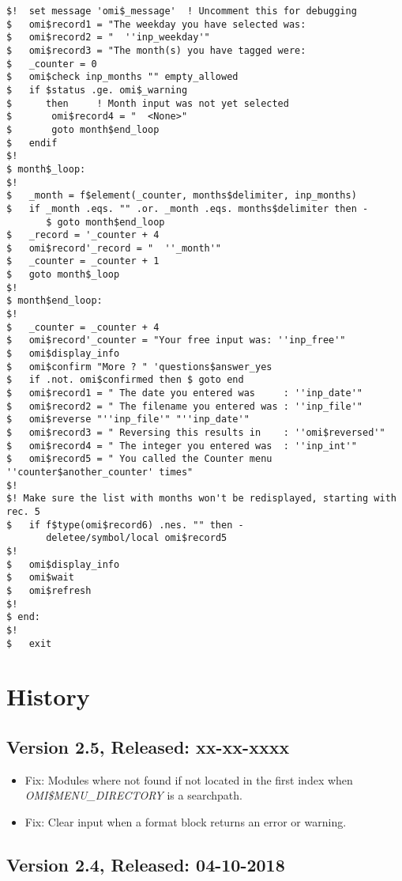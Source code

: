 \documentclass[a4paper]{book}
\begin{document}
\begin{verbatim}
$!	set message 'omi$_message'	! Uncomment this for debugging
$	omi$record1 = "The weekday you have selected was:
$	omi$record2 = "  ''inp_weekday'"
$	omi$record3 = "The month(s) you have tagged were:
$	_counter = 0
$	omi$check inp_months "" empty_allowed
$	if $status .ge. omi$_warning
$	   then 	! Month input was not yet selected
$		omi$record4 = "  <None>"
$		goto month$end_loop
$	endif
$!
$ month$_loop:
$!
$	_month = f$element(_counter, months$delimiter, inp_months)
$	if _month .eqs. "" .or. _month .eqs. months$delimiter then -
	   $ goto month$end_loop
$	_record = '_counter + 4
$	omi$record'_record = "  ''_month'"
$	_counter = _counter + 1
$	goto month$_loop
$!
$ month$end_loop:
$!
$	_counter = _counter + 4
$	omi$record'_counter = "Your free input was: ''inp_free'"
$	omi$display_info
$	omi$confirm "More ? " 'questions$answer_yes
$	if .not. omi$confirmed then $ goto end
$	omi$record1 = " The date you entered was     : ''inp_date'"
$	omi$record2 = " The filename you entered was : ''inp_file'"
$	omi$reverse "''inp_file'" "''inp_date'"
$	omi$record3 = " Reversing this results in    : ''omi$reversed'"
$	omi$record4 = " The integer you entered was  : ''inp_int'"
$	omi$record5 = " You called the Counter menu ''counter$another_counter' times"
$!
$! Make sure the list with months won't be redisplayed, starting with rec. 5
$	if f$type(omi$record6) .nes. "" then -
	   deletee/symbol/local omi$record5
$!
$	omi$display_info
$	omi$wait
$	omi$refresh
$!
$ end:
$!
$	exit
\end{verbatim}

\chapter{History}

\section*{Version 2.5, Released: xx-xx-xxxx}

\begin{itemize}
\item Fix: Modules where not found if not located in the first index when \textsl{OMI{\$}MENU{\_}DIRECTORY} is a searchpath.
\item Fix: Clear input when a format block returns an error or warning.
\end{itemize}

\section*{Version 2.4, Released: 04-10-2018}
\end{document}
